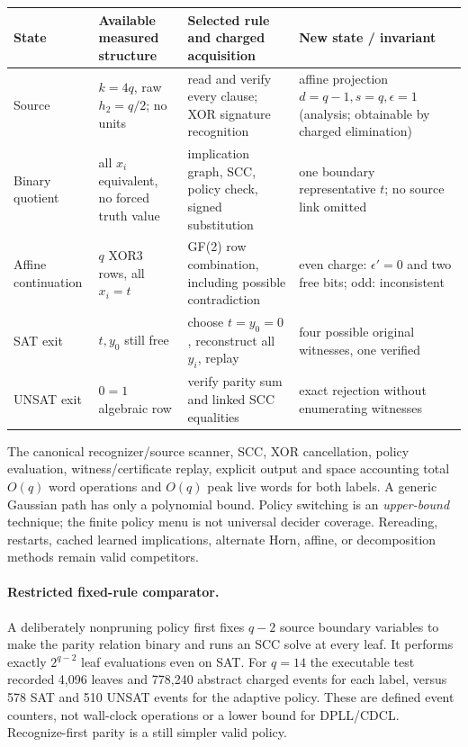 \documentclass[11pt]{article}
\begin{document}
\begin{center}
\begin{tabular}{p{.19\linewidth}p{.25\linewidth}p{.27\linewidth}p{.20\linewidth}}
\toprule
State & Available measured structure & Selected rule and charged acquisition & New state / invariant\\
\midrule
Source & $k=4q$, raw $h_2=q/2$; no units & read and verify every clause; XOR signature recognition & affine projection $d=q-1,s=q,\epsilon=1$ (analysis; obtainable by charged elimination)\\
Binary quotient & all $x_i$ equivalent, no forced truth value & implication graph, SCC, policy check, signed substitution & one boundary representative $t$; no source link omitted\\
Affine continuation & $q$ XOR3 rows, all $x_i=t$ & GF(2) row combination, including possible contradiction & even charge: $\epsilon'=0$ and two free bits; odd: inconsistent\\
SAT exit & $t,y_0$ still free & choose $t=y_0=0$, reconstruct all $y_i$, replay & four possible original witnesses, one verified\\
UNSAT exit & $0=1$ algebraic row & verify parity sum and linked SCC equalities & exact rejection without enumerating witnesses\\
\bottomrule
\end{tabular}
\end{center}
The canonical recognizer/source scanner, SCC, XOR cancellation,
policy evaluation, witness/certificate replay, explicit output and
space accounting total $O(q)$ word operations and $O(q)$ peak
live words for both labels. A generic Gaussian path has only
a polynomial bound. Policy switching is an \emph{upper-bound}
technique; the finite policy menu is not universal decider coverage.
Rereading, restarts, cached learned implications, alternate Horn,
affine, or decomposition methods remain valid competitors.

\paragraph{Restricted fixed-rule comparator.}
A deliberately nonpruning policy first fixes $q-2$ source
boundary variables to make the parity relation binary and runs
an SCC solve at every leaf. It performs exactly $2^{q-2}$
leaf evaluations even on SAT. For $q=14$ the executable test
recorded 4,096 leaves and 778,240 abstract charged events
for each label, versus 578 SAT and 510 UNSAT events for
the adaptive policy. These are defined event counters, not
wall-clock operations or a lower bound for DPLL/CDCL.
Recognize-first parity is a still simpler valid policy.
\end{document}
